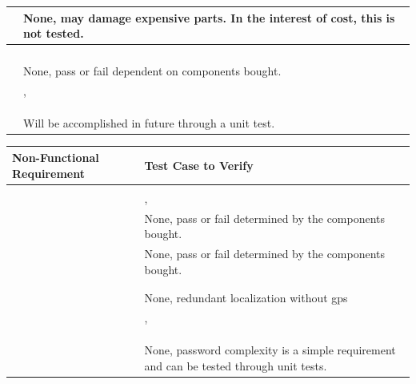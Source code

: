 \documentclass[12pt, titlepage]{article}
\begin{document}
\begin{table}[!h]
\begin{center}
\begin{tabular}{ | m{3cm} | m{12cm} | }
\nameref{MTNC_003} & None, may damage expensive parts. In the interest of cost, this is not tested. \\ \hline
\nameref{SAFE_001} & \nameref{tab:STC_021} \\ \hline
\nameref{SAFE_002} & \nameref{tab:STC_002} \\ \hline
\nameref{SAFE_003} & \nameref{tab:STC_018} \\ \hline
\nameref{SAFE_004} & \nameref{tab:STC_021} \\ \hline
\nameref{SAFE_005} & None, pass or fail dependent on components bought. \\ \hline
\nameref{USE_001} & \nameref{tab:STC_004}, \nameref{tab:STC_011} \\ \hline
\nameref{USE_002} & \nameref{tab:STC_022} \\ \hline
\nameref{USE_003} & \nameref{tab:STC_006} \\ \hline
\nameref{USE_004} & \nameref{tab:STC_017} \\ \hline
\nameref{USE_005} & Will be accomplished in future through a unit test. \\ \hline
\end{tabular}
\end{center}
\end{table}


\begin{table}[!h]
\begin{center}
\begin{tabular}{ | m{8cm} | m{8cm} | } 
\hline
Non-Functional Requirement & Test Case to Verify \\
\hline
\nameref{SR_002} & \nameref{tab:STC_018} \\ \hline
\nameref{SR_003} & \nameref{tab:STC_005}, \nameref{tab:STC_006} \\ \hline
\nameref{SR_004} & None, pass or fail determined by the components bought. \\ \hline
\nameref{SR_005} & None, pass or fail determined by the components bought. \\ \hline
\nameref{SR_006} & \nameref{tab:STC_018} \\ \hline
\nameref{SR_007} & \nameref{tab:STC_010} \\ \hline
\nameref{SR_008} & None, redundant localization without gps \\ \hline
\nameref{SR_009} & \nameref{tab:STC_015}, \nameref{tab:STC_014} \\ \hline
\nameref{SR_010} & \nameref{tab:STC_018} \\ \hline
\nameref{SR_011} & \nameref{tab:STC_006} \\ \hline
\nameref{SR_012} & \nameref{tab:STC_007} \\ \hline
\nameref{SR_013} & None, password complexity is a simple requirement and can be tested through unit tests. \\ \hline
\end{tabular}
\end{center}
\end{table}
\end{document}
